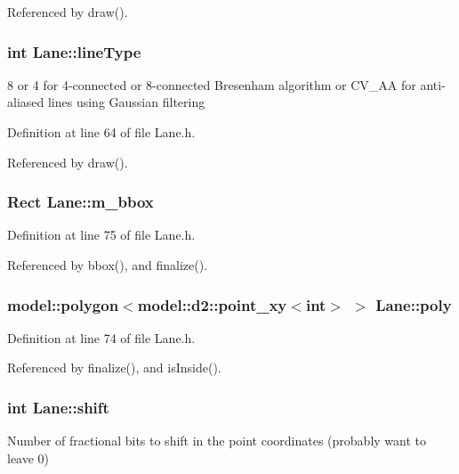 \-Referenced by draw().

\hypertarget{class_lane_a3739821c9f0ac97c302dd05af44d58fd}{
\subsubsection[{line\-Type}]{\setlength{\rightskip}{0pt plus 5cm}int {\bf \-Lane\-::line\-Type}}}
\label{class_lane_a3739821c9f0ac97c302dd05af44d58fd}
8 or 4 for 4-\/connected or 8-\/connected \-Bresenham algorithm or \-C\-V\-\_\-\-A\-A for anti-\/aliased lines using \-Gaussian filtering 

\-Definition at line 64 of file \-Lane.\-h.



\-Referenced by draw().

\hypertarget{class_lane_a00ae117899030b8d079edb4aba92f86c}{
\subsubsection[{m\-\_\-bbox}]{\setlength{\rightskip}{0pt plus 5cm}\-Rect {\bf \-Lane\-::m\-\_\-bbox}}}
\label{class_lane_a00ae117899030b8d079edb4aba92f86c}


\-Definition at line 75 of file \-Lane.\-h.



\-Referenced by bbox(), and finalize().

\hypertarget{class_lane_a8e0f8b6ff11437a3b16f8e030d1ea271}{
\subsubsection[{poly}]{\setlength{\rightskip}{0pt plus 5cm}model\-::polygon$<$model\-::d2\-::point\-\_\-xy$<$int$>$ $>$ {\bf \-Lane\-::poly}}}
\label{class_lane_a8e0f8b6ff11437a3b16f8e030d1ea271}


\-Definition at line 74 of file \-Lane.\-h.



\-Referenced by finalize(), and is\-Inside().

\hypertarget{class_lane_afd053ab5133d132146bef9f3c7afe92e}{
\subsubsection[{shift}]{\setlength{\rightskip}{0pt plus 5cm}int {\bf \-Lane\-::shift}}}
\label{class_lane_afd053ab5133d132146bef9f3c7afe92e}
\-Number of fractional bits to shift in the point coordinates (probably want to leave 0) 

